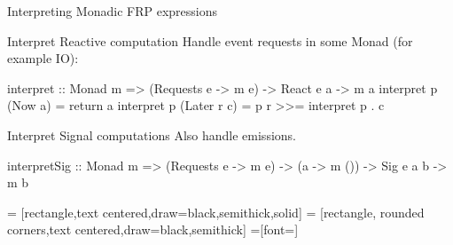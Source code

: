 \documentclass{beamer}
\begin{document}
\begin{frame}{Interpreting Monadic FRP expressions}
\begin{block}{Interpret Reactive computation}
Handle event requests in some Monad (for example IO):
\begin{code}
interpret ::  Monad m => (Requests e -> m e) 
              -> React e a -> m a
interpret p (Now a)     = return a
interpret p (Later r c)  = p r >>= interpret p . c
\end{code}
\end{block}

\begin{block}{Interpret Signal computations}
Also handle emissions.
\begin{code}
interpretSig ::  Monad m  => (Requests e -> m e) 
                 -> (a -> m ()) -> Sig e a b -> m b
\end{code}
\end{block}

\end{frame}



 = [rectangle,text centered,draw=black,semithick,solid]
 = [rectangle, rounded corners,text centered,draw=black,semithick]
 =[font=\small]
\end{document}
